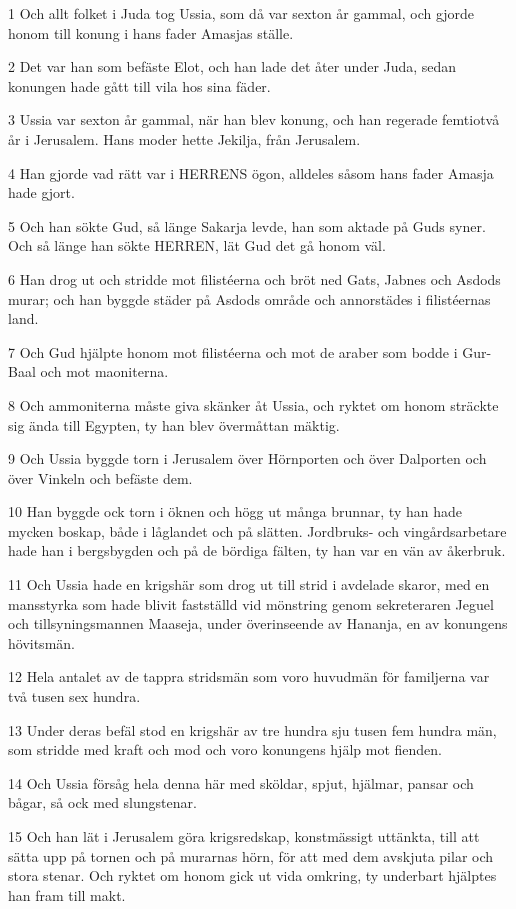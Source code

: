 \par 1 Och allt folket i Juda tog Ussia, som då var sexton år gammal, och gjorde honom till konung i hans fader Amasjas ställe.
\par 2 Det var han som befäste Elot, och han lade det åter under Juda, sedan konungen hade gått till vila hos sina fäder.
\par 3 Ussia var sexton år gammal, när han blev konung, och han regerade femtiotvå år i Jerusalem. Hans moder hette Jekilja, från Jerusalem.
\par 4 Han gjorde vad rätt var i HERRENS ögon, alldeles såsom hans fader Amasja hade gjort.
\par 5 Och han sökte Gud, så länge Sakarja levde, han som aktade på Guds syner. Och så länge han sökte HERREN, lät Gud det gå honom väl.
\par 6 Han drog ut och stridde mot filistéerna och bröt ned Gats, Jabnes och Asdods murar; och han byggde städer på Asdods område och annorstädes i filistéernas land.
\par 7 Och Gud hjälpte honom mot filistéerna och mot de araber som bodde i Gur-Baal och mot maoniterna.
\par 8 Och ammoniterna måste giva skänker åt Ussia, och ryktet om honom sträckte sig ända till Egypten, ty han blev övermåttan mäktig.
\par 9 Och Ussia byggde torn i Jerusalem över Hörnporten och över Dalporten och över Vinkeln och befäste dem.
\par 10 Han byggde ock torn i öknen och högg ut många brunnar, ty han hade mycken boskap, både i låglandet och på slätten. Jordbruks- och vingårdsarbetare hade han i bergsbygden och på de bördiga fälten, ty han var en vän av åkerbruk.
\par 11 Och Ussia hade en krigshär som drog ut till strid i avdelade skaror, med en mansstyrka som hade blivit fastställd vid mönstring genom sekreteraren Jeguel och tillsyningsmannen Maaseja, under överinseende av Hananja, en av konungens hövitsmän.
\par 12 Hela antalet av de tappra stridsmän som voro huvudmän för familjerna var två tusen sex hundra.
\par 13 Under deras befäl stod en krigshär av tre hundra sju tusen fem hundra män, som stridde med kraft och mod och voro konungens hjälp mot fienden.
\par 14 Och Ussia försåg hela denna här med sköldar, spjut, hjälmar, pansar och bågar, så ock med slungstenar.
\par 15 Och han lät i Jerusalem göra krigsredskap, konstmässigt uttänkta, till att sätta upp på tornen och på murarnas hörn, för att med dem avskjuta pilar och stora stenar. Och ryktet om honom gick ut vida omkring, ty underbart hjälptes han fram till makt.
